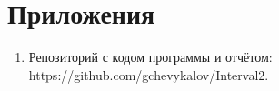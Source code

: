 \section{Приложения}
\begin{enumerate}
    \item Репозиторий с кодом программы и отчётом:\\
    https://github.com/gchevykalov/Interval2.
\end{enumerate}